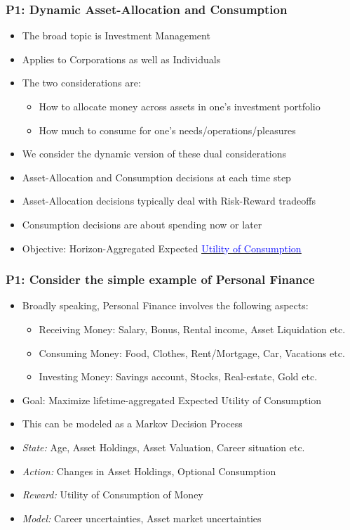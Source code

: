 \documentclass[handout]{beamer}
\begin{document}
\begin{frame}
\frametitle{P1: Dynamic Asset-Allocation and Consumption}
\pause
\begin{itemize}[<+->]
\item The broad topic is Investment Management
\item Applies to Corporations as well as Individuals
\item The two considerations are:
\pause
\begin{itemize}[<+->]
\item How to allocate money across assets in one's investment portfolio
\item How much to consume for one's needs/operations/pleasures
\end{itemize}
\item We consider the dynamic version of these dual considerations
\item Asset-Allocation and Consumption decisions at each time step
\item Asset-Allocation decisions typically deal with Risk-Reward tradeoffs
\item Consumption decisions are about spending now or later
\item Objective: Horizon-Aggregated Expected \href{https://github.com/coverdrive/technical-documents/blob/master/finance/cme241/Tour-UtilityTheory.pdf}{\underline{\textcolor{blue}{Utility of Consumption}}}
\end{itemize}
\end{frame}

\begin{frame}
\frametitle{P1: Consider the simple example of Personal Finance}
\pause
\begin{itemize}[<+->]
\item Broadly speaking, Personal Finance involves the following aspects:
\pause
\begin{itemize}[<+->]
\item Receiving Money: Salary, Bonus, Rental income, Asset Liquidation etc.
\item Consuming Money: Food, Clothes, Rent/Mortgage, Car, Vacations etc.
\item Investing Money: Savings account, Stocks, Real-estate, Gold etc.
\end{itemize}
\item Goal: Maximize lifetime-aggregated Expected Utility of Consumption
\item This can be modeled as a Markov Decision Process
\item {\em State:} Age, Asset Holdings, Asset Valuation, Career situation etc.
\item {\em Action:} Changes in Asset Holdings, Optional Consumption
\item {\em Reward:} Utility of Consumption of Money
\item {\em Model:} Career uncertainties, Asset market uncertainties
\end{itemize}
\end{frame}
\end{document}
